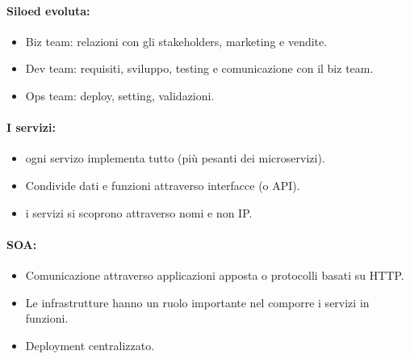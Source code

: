 \paragraph{Siloed evoluta:}

\begin{itemize}
	\item Biz team: relazioni con gli stakeholders, marketing e vendite.
	\item Dev team: requisiti, sviluppo, testing e comunicazione con il biz team.
	\item Ops team: deploy, setting, validazioni.
\end{itemize}





\paragraph{I servizi:}

\begin{itemize}
	\item {} ogni servizo implementa tutto (più pesanti dei microservizi).
	\item Condivide dati e funzioni attraverso interfacce (o API).
	\item {} i servizi si scoprono attraverso nomi e non IP.
\end{itemize}

\paragraph{SOA:}

\begin{itemize}
	\item Comunicazione attraverso applicazioni apposta o protocolli basati su HTTP.
	\item Le infrastrutture hanno un ruolo importante nel comporre i servizi in funzioni.
	\item Deployment centralizzato.
\end{itemize}

